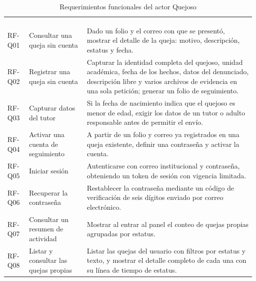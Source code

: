 	\begin{longtable}{|L{1.7cm}|L{4.0cm}|L{9.9cm}|}
		\hiderowcolors\caption{Requerimientos funcionales del actor Quejoso}
		\label{tab:rf_quejoso} \\ \showrowcolors
		\hline
		 &  &  \\
		\hline
		\endfirsthead
	
		\hline
		 &  &  \\
		\hline
		\endhead
	
		RF-Q01 & Consultar una queja sin cuenta & Dado un folio y el correo con que se presentó,
		mostrar el detalle de la queja: motivo, descripción, estatus y fecha. \\ \hline
	
		RF-Q02 & Registrar una queja sin cuenta & Capturar la identidad completa del quejoso,
		unidad académica, fecha de los hechos, datos del denunciado, descripción libre y varios
		archivos de evidencia en una sola petición; generar un folio de seguimiento. \\ \hline
	
		RF-Q03 & Capturar datos del tutor & Si la fecha de nacimiento indica que el quejoso es menor
		de edad, exigir los datos de un tutor o adulto responsable antes de permitir el envío.
		\\ \hline
	
		RF-Q04 & Activar una cuenta de seguimiento & A partir de un folio y correo ya registrados en
		una queja existente, definir una contraseña y activar la cuenta. \\ \hline
	
		RF-Q05 & Iniciar sesión & Autenticarse con correo institucional y contraseña, obteniendo un
		token de sesión con vigencia limitada. \\ \hline
	
		RF-Q06 & Recuperar la contraseña & Restablecer la contraseña mediante un código de
		verificación de seis dígitos enviado por correo electrónico. \\ \hline
	
		RF-Q07 & Consultar un resumen de actividad & Mostrar al entrar al panel el conteo de quejas
		propias agrupadas por estatus. \\ \hline
	
		RF-Q08 & Listar y consultar las quejas propias & Listar las quejas del usuario con filtros
		por estatus y texto, y mostrar el detalle completo de cada una con su línea de tiempo de
		estatus. \\ \hline
	

\end{longtable}

